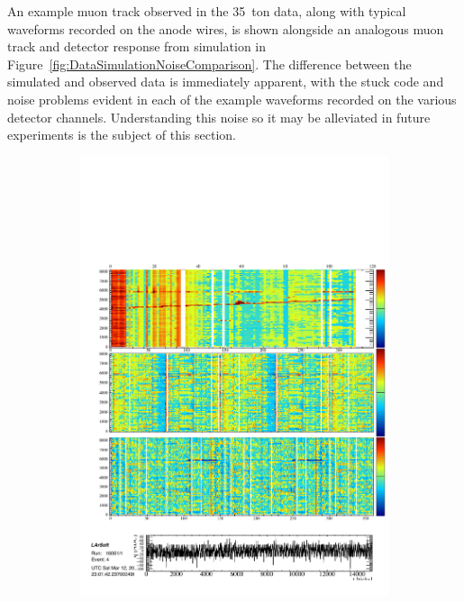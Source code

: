 An example muon track observed in the 35~ton data, along with typical waveforms recorded on the anode wires, is shown alongside an analogous muon track and detector response from simulation in Figure~\ref{fig:DataSimulationNoiseComparison}.  The difference between the simulated and observed data is immediately apparent, with the stuck code and noise problems evident in each of the example waveforms recorded on the various detector channels.  Understanding this noise so it may be alleviated in future experiments is the subject of this section.

\begin{figure}
  \centering

  \begin{subfigure}[t]{\linewidth}
    \centering
    \begin{minipage}{0.48\textwidth}
      \centering
      \includegraphics[width=\textwidth]{DataMuon.pdf}

\end{minipage}
\end{subfigure}
\end{figure}
